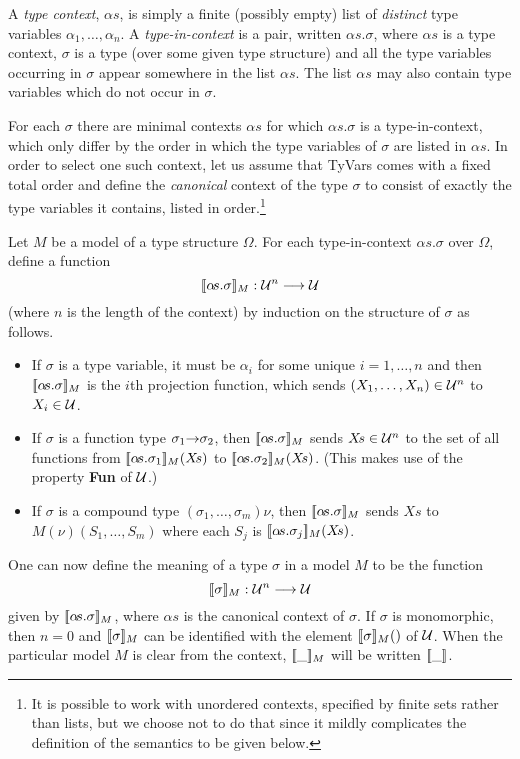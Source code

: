 A {\em type context}, $\alpha\!s$, is simply a
finite (possibly empty) list of {\em distinct\/} type variables
$\alpha_{1},\ldots,\alpha_{n}$.  A {\em
type-in-context\/} is a pair, written
$\alpha\!s.\sigma$, where $\alpha\!s$ is a type context, $\sigma$ is a
type (over some given type structure) and all the type variables
occurring in $\sigma$ appear somewhere in the list $\alpha\!s$. The
list $\alpha\!s$ may also contain type variables which do not occur in
$\sigma$.

For each $\sigma$ there are minimal contexts $\alpha\!s$ for which
$\alpha\!s.\sigma$ is a type-in-context, which only differ by the order
in which the type variables of $\sigma$ are listed in $\alpha\!s$. In
order to select one such context, let us assume that  {\sf TyVars}
comes with a fixed total order and define the {\em
canonical} context of the type $\sigma$ to consist of
exactly the type variables it contains, listed in order.\footnote{It is
possible to work with unordered contexts, specified by finite sets
rather than lists, but we choose not to do that since it mildly
complicates the definition of the semantics to be given
below.}

Let $M$ be a model of a type structure $\Omega$. For each
type-in-context
$\alpha\!s.\sigma$ over $\Omega$, define a function
\[
[\![\alpha\!s.\sigma]\!]_{M}:{\cal U}^{n}\longrightarrow{\cal U}
\]
(where $n$ is the length of the context) by induction on the structure
of $\sigma$ as follows.
\begin{itemize}

\item If $\sigma$ is a type variable, it must be $\alpha_{i}$ for some unique
$i=1,\ldots,n$ and then $[\![\alpha\!s.\sigma]\!]_{M}$ is the $i$\/th
projection function, which sends $(X_{1},\ldots,X_{n})\in{\cal U}^{n}$
to $X_{i}\in{\cal U}$.

\item If $\sigma$ is a function type
$\sigma_{1}{\to}\sigma_{2}$, then $[\![\alpha\!s.\sigma]\!]_M$ sends
$X\!s\in{\cal U}^n$ to the set of all functions
from $[\![\alpha\!s.\sigma_1]\!]_M(X\!s)$ to
$[\![\alpha\!s.\sigma_2]\!]_M(X\!s)$. (This makes
use of the property {\bf Fun} of $\cal U$.)

\item If $\sigma$ is a
compound type $(\sigma_{1},\ldots,\sigma_{m})\nu$, then
$[\![\alpha\!s.\sigma]\!]_{M}$ sends $X\!s$ to
$M(\nu)(S_{1},\ldots,S_{m})$ where each $S_{j}$ is
$[\![\alpha\!s.\sigma_{j}]\!]_{M}(X\!s)$.
\end{itemize}
One can now define the meaning of a type $\sigma$ in a model $M$ to be
the function
\[
[\![\sigma]\!]_{M}:{\cal U}^{n}\longrightarrow{\cal U}
\]
given by $[\![\alpha\!s.\sigma]\!]_{M}$, where $\alpha\!s$ is the
canonical context of $\sigma$. If $\sigma$ is monomorphic, then $n=0$
and $[\![\sigma]\!]_{M}$ can be identified with the element
$[\![\sigma]\!]_{M}()$ of $\cal U$. When the particular model $M$ is
clear from the context, $[\![\_]\!]_{M}$ will be written $[\![\_]\!]$.

